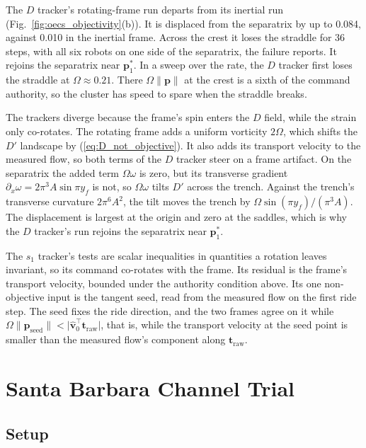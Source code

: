 \documentclass[lettersize,journal]{IEEEtran}
\begin{document}
The $D$ tracker's rotating-frame run departs from its inertial run
(Fig.~\ref{fig:oecs_objectivity}(b)). It is displaced from the separatrix
by up to 0.084, against 0.010 in the inertial frame. Across the crest it
loses the straddle for 36 steps, with all six robots on one side of the
separatrix, the failure \cite{26} reports. It rejoins the separatrix near
$\mathbf{p}_1^*$. In a sweep over the rate, the $D$ tracker first loses the
straddle at $\Omega \approx 0.21$. There $\Omega\lVert\mathbf{p}\rVert$ at
the crest is a sixth of the command authority, so the cluster has speed to
spare when the straddle breaks.

The trackers diverge because the frame's spin enters the $D$ field, while
the strain only co-rotates. The rotating frame adds a uniform vorticity $2\Omega$, which
shifts the $D'$ landscape by (\ref{eq:D_not_objective}). It also adds its
transport velocity to the measured flow, so both terms of the $D$ tracker
steer on a frame artifact. On the separatrix the added term
$\Omega\omega$ is zero, but its transverse gradient
$\partial_x\omega = 2\pi^3 A\sin\pi y_f$ is not, so $\Omega\omega$ tilts
$D'$ across the trench. Against the trench's transverse curvature
$2\pi^6 A^2$, the tilt moves the trench by
$\Omega\sin(\pi y_f)/(\pi^3 A)$. The displacement is largest at the origin
and zero at the saddles, which is why the $D$ tracker's run rejoins the
separatrix near $\mathbf{p}_1^*$.

The $s_1$ tracker's tests are scalar inequalities in quantities a rotation
leaves invariant, so its command co-rotates with the frame. Its residual is
the frame's transport velocity, bounded under the authority condition above. Its one non-objective input is the tangent
seed, read from the measured flow on the first ride step. The seed fixes
the ride direction, and the two frames agree on it while
$\Omega\lVert\mathbf{p}_{\text{seed}}\rVert <
\lvert\hat{\mathbf{v}}_0^\top\mathbf{t}_{\text{raw}}\rvert$, that is, while
the transport velocity at the seed point is smaller than the measured
flow's component along $\mathbf{t}_{\text{raw}}$.

\section{Santa Barbara Channel Trial}
\label{sec:ocean}

\subsection{Setup}
\label{sec:ocean_sim}
\end{document}
